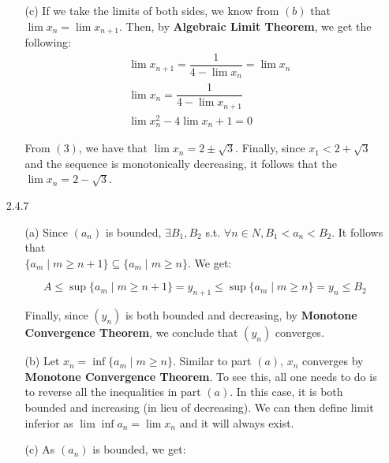 \documentclass[11pt]{article}
\begin{document}
\begin{itemize}
\begin{itemize}
            \item[(c)]
                If we take the limits of both sides, we know from $(b)$ that
                $\lim{x_n} = \lim{x_{n + 1}}$. Then, by \textbf{Algebraic Limit
                Theorem}, we get the following:
                \begin{align}
                    &\lim{x_{n + 1}} = \dfrac{1}{4 - \lim{x_n}} = \lim{x_n}\\
                    &\lim{x_n} = \dfrac{1}{4 - \lim{x_{n + 1}}}\\
                    &\lim{x^2_n} - 4\lim{x_n} + 1 = 0
                \end{align}

                From $(3)$, we have that $\lim{x_n} = 2 \pm \sqrt{3}$. Finally,
                since $x_1 < 2 + \sqrt{3}$ and the sequence is monotonically
                decreasing, it follows that the $\lim{x_n} = 2 - \sqrt{3}$.
        \end{itemize}

    \item[2.4.7]
        \begin{itemize}
            \item[(a)]
                Since $(a_n)$ is bounded, $\exists B_1, B_2$ s.t. $\forall n
                \in N, B_1 < a_n < B_2$. It follows that\\ $\{a_m \mid m \geq n
                + 1\} \subseteq \{a_m \mid m \geq n\}$. We get:

                $$A \leq \sup{\{ a_m \mid m \geq n + 1\}} = y_{n + 1} \leq
                \sup{\{a_m \mid m \geq n\}} = y_n \leq B_2$$

                Finally, since $(y_n)$ is both bounded and decreasing, by
                \textbf{Monotone Convergence Theorem}, we conclude that $(y_n)$
                converges.

            \item[(b)]
                Let $x_n = \inf{\{a_m \mid m \geq n\}}$. Similar to part $(a)$,
                $x_n$ converges by \textbf{Monotone Convergence Theorem}. To
                see this, all one needs to do is to reverse all the
                inequalities in part $(a)$. In this case, it is both bounded
                and increasing (in lieu of decreasing). We can then define
                limit inferior as $\lim{\inf{{a_n}}} = \lim{x_n}$ and it will
                always exist.
                
            \item[(c)]
                As $(a_n)$ is bounded, we get:


\end{itemize}
\end{itemize}
\end{document}
